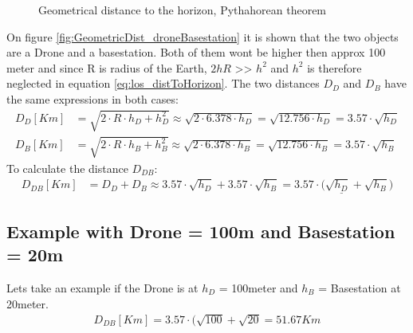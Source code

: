 \begin{figure}%
    \centering
    \qquad
    \caption{Geometrical distance to the horizon, Pythahorean theorem}%
    \label{fig:GeometricDistanceToHorizon}%
\end{figure}

On figure \ref{fig:GeometricDist_droneBasestation} it is shown that the two objects are a Drone and a basestation. Both of them wont be higher then approx 100 meter and since R is radius of the Earth, $2hR$ >> $h^2$ and $h^2$ is therefore neglected in equation \ref{eq:los_distToHorizon}. The two distances $D_D$ and $D_B$ have the same expressions in both cases:
\begin{align}
D_D [Km] &= \sqrt{2\cdot R \cdot h_D + h_{D}^2} \approx \sqrt{2\cdot 6.378\cdot h_D} = \sqrt{12.756\cdot h_D} = 3.57\cdot \sqrt{h_D} \\
D_B [Km] &= \sqrt{2\cdot R \cdot h_B + h_{B}^2} \approx \sqrt{2\cdot 6.378\cdot h_B} = \sqrt{12.756\cdot h_B} = 3.57\cdot \sqrt{h_B}
\end{align}
To calculate the distance $D_{DB}$:
\begin{align}
D_{DB}[Km] &= D_D + D_B \approx 3.57\cdot \sqrt{h_D} + 3.57\cdot \sqrt{h_B} = \underline{3.57\cdot (\sqrt{h_D} + \sqrt{h_B}} )
\end{align}

\subsection{Example with Drone = 100m and Basestation = 20m}
Lets take an example if the Drone is at $h_D$ = 100meter and $h_B$ = Basestation at 20meter.
\begin{align}
D_{DB}[Km] = 3.57\cdot (\sqrt{100} + \sqrt{20} = 51.67Km
\end{align}
